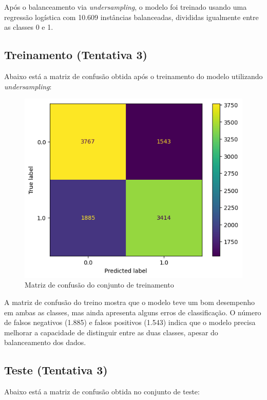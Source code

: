 \documentclass{abntpuc}
\begin{document}
Após o balanceamento via \textit{undersampling}, o modelo foi treinado usando uma regressão logística com 10.609 instâncias balanceadas, divididas igualmente entre as classes 0 e 1.

\subsection*{\centering\Large\textbf{Treinamento (Tentativa 3)}}
Abaixo está a matriz de confusão obtida após o treinamento do modelo utilizando \textit{undersampling}:

\begin{figure}[H]
    \centering
    \includegraphics[width=\textwidth]{grafico9.png}
    \caption{Matriz de confusão do conjunto de treinamento}
\end{figure}

A matriz de confusão do treino mostra que o modelo teve um bom desempenho em ambas as classes, mas ainda apresenta alguns erros de classificação. O número de falsos negativos (1.885) e falsos positivos (1.543) indica que o modelo precisa melhorar a capacidade de distinguir entre as duas classes, apesar do balanceamento dos dados.

\subsection*{\centering\Large\textbf{Teste (Tentativa 3)}}
Abaixo está a matriz de confusão obtida no conjunto de teste:
\end{document}
